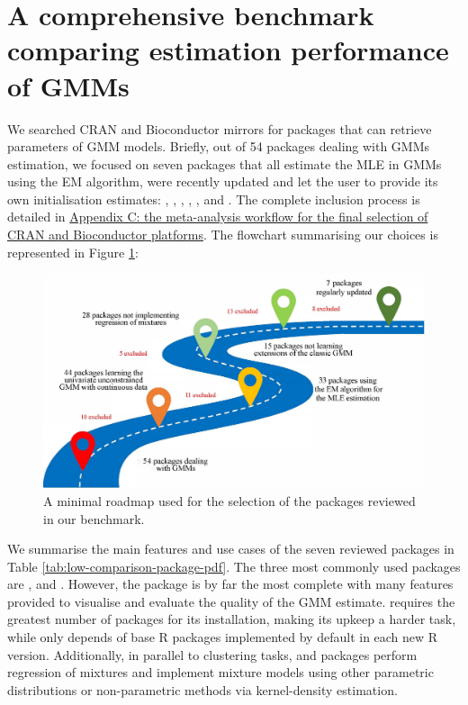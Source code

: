 \hypertarget{a-comprehensive-benchmark-comparing-estimation-performance-of-gmms}{%
\section{A comprehensive benchmark comparing estimation performance of GMMs}\label{a-comprehensive-benchmark-comparing-estimation-performance-of-gmms}}

We searched CRAN and Bioconductor mirrors for packages that can retrieve
parameters of GMM models. Briefly, out of 54 packages dealing with GMMs
estimation, we focused on seven packages that all estimate the
MLE in GMMs using the EM algorithm, were recently
updated and let the user to provide its own initialisation estimates:
, , ,
, ,  and . The
complete inclusion process is detailed in \protect\hyperlink{appendix-c-the-meta-analysis-workflow-for-the-final-selection-of-cran-and-bioconductor-platforms}{Appendix C: the meta-analysis workflow for the final selection of CRAN and Bioconductor platforms}. The flowchart summarising
our choices is represented in Figure \ref{fig:flowchart}:

\begin{figure}

{\centering \includegraphics[width=1\linewidth]{figs/flowchart_packages_selection} 

}

\caption{A minimal roadmap used for the selection of the packages reviewed in our benchmark.}\label{fig:flowchart}
\end{figure}

We summarise the main features and use cases of the seven reviewed
packages in Table
\ref{tab:low-comparison-package-pdf}.
The three most commonly used packages are ,  and . However, the  package is by far the most complete with many features provided to
visualise and evaluate the quality of the GMM estimate.  requires
the greatest number of packages for its installation, making its upkeep
a harder task, while  only depends of base R packages
implemented by default in each new R version. Additionally, in parallel
to clustering tasks,  and  packages perform
regression of mixtures and implement mixture models using other
parametric distributions or non-parametric methods via kernel-density
estimation.

